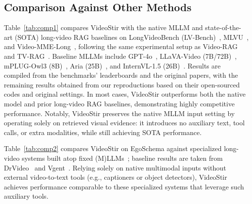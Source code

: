 \subsection{Comparison Against Other Methods} %
Table~\ref{tab:comp1} compares VideoStir with the native MLLM and state-of-the-art (SOTA) long-video RAG baselines on LongVideoBench (LV-Bench)~\cite{lvb}, MLVU~\cite{mlvu}, and Video-MME-Long~\cite{videomme}, following the same experimental setup as Video-RAG~\cite{Video-RAG} and TV-RAG~\cite{TVRAG}. Baseline MLLMs include GPT-4o~\cite{hurst2024gpt}, LLaVA-Video (7B/72B)~\cite{zhang2024video}, mPLUG-Owl3 (8B)~\cite{ye2024mplug}, Aria (25B)~\cite{aria}, and InternVL-1.5 (26B)~\cite{chen2024far}. Results are compiled from the benchmarks’ leaderboards and the original papers, with the remaining results obtained from our reproductions based on their open-sourced codes and original settings. In most cases, VideoStir outperforms both the native model and prior long-video RAG baselines, demonstrating highly competitive performance. Notably, VideoStir preserves the native MLLM input setting by operating solely on retrieved visual evidence: it introduces no auxiliary text, tool calls, or extra modalities, while still achieving SOTA performance.  

Table~\ref{tab:comp2} compares VideoStir on EgoSchema against specialized long-video systems built atop fixed (M)LLMs~\cite{egoschema}; baseline results are taken from DrVideo~\cite{drvideo} and Vgent~\cite{vgent}. Relying solely on native multimodal inputs without external video-to-text tools (e.g., captioners or object detectors), VideoStir achieves performance comparable to these specialized systems that leverage such auxiliary tools.




